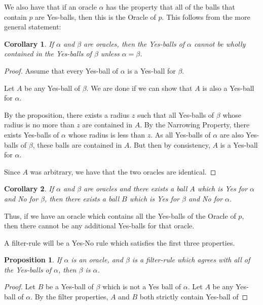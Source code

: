 \documentclass[12pt]{article}
\newtheorem{corollary}{Corollary}[section]
\newtheorem{proposition}{Proposition}[section]
\begin{document}
We also have that if an oracle $\alpha$ has the property that all of the balls that contain $p$ are Yes-balls, then this is the Oracle of $p$. This follows from the more general statement: 


\begin{corollary}
    If $\alpha$ and $\beta$ are oracles, then the Yes-balls of $\alpha$ cannot be wholly contained in the Yes-balls of $\beta$ unless $\alpha=\beta$.
\end{corollary}

\begin{proof}
    Assume that every Yes-ball of $\alpha$ is a Yes-ball for $\beta$.

    Let $A$ be any Yes-ball of $\beta$. We are done if we can show that $A$ is also a Yes-ball for $\alpha$.
    
    By the proposition, there exists a radius $z$ such that all Yes-balls of $\beta$ whose radius is no more than $z$ are contained in $A$. By the Narrowing Property, there exists Yes-balls of $\alpha$ whose radius is less than $z$. As all Yes-balls of $\alpha$ are also Yes-balls of $\beta$, these balls are contained in $A$. But then by consistency, $A$ is a Yes-ball for $\alpha$.

    Since $A$ was arbitrary, we have that the two oracles are identical. 
    
\end{proof}

\begin{corollary}\label{cor:yesno}
    If $\alpha$ and $\beta$ are oracles and there exists a ball $A$ which is Yes for $\alpha$ and No for $\beta$, then there exists a ball $B$ which is Yes for $\beta$ and No for $\alpha$. 
\end{corollary}

Thus, if we have an oracle which contains all the Yes-balls of the Oracle of $p$, then there cannot be any additional Yes-balls for that oracle. 

A filter-rule will be a Yes-No rule which satisfies the first three properties. 

\begin{proposition}
    If $\alpha$ is an oracle, and $\beta$ is a filter-rule which agrees with all of the Yes-balls of $\alpha$, then $\beta$ is $\alpha$.
\end{proposition}

\begin{proof}
    Let $B$ be a Yes-ball of $\beta$ which is not a Yes ball of $\alpha$. Let $A$ be any Yes-ball of $\alpha$. By the filter properties, $A$ and $B$ both strictly contain  Yes-ball of 
\end{proof}
\end{document}

